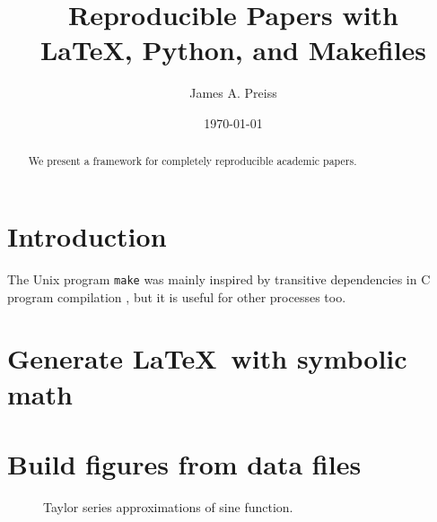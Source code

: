 \documentclass{article}
\title{Reproducible Papers with\\ \LaTeX, Python, and Makefiles}
\author{James A. Preiss}
\date{\today}
\begin{document}
\maketitle

\begin{abstract}
    We present a framework for completely reproducible academic papers.%
\end{abstract}

\section{Introduction}

The Unix program \texttt{make} was mainly inspired by transitive dependencies in C program compilation \citep{feldman1979make},
but it is useful for other processes too.

\section{Generate \LaTeX\ with symbolic math}


\section{Build figures from data files}

\begin{figure}[h]
    \centering
    
    \caption{Taylor series approximations of sine function.}
\end{figure}

\newpage



\end{document}
